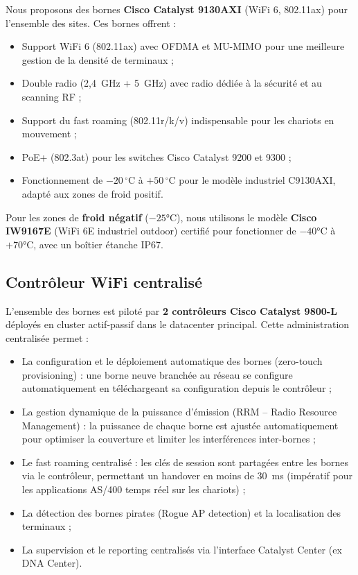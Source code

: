 \documentclass[12pt,a4paper]{report}
\begin{document}
Nous proposons des bornes \textbf{Cisco Catalyst 9130AXI} (WiFi 6, 802.11ax) pour l'ensemble des sites. Ces bornes offrent :

\begin{itemize}
\item Support WiFi 6 (802.11ax) avec OFDMA et MU-MIMO pour une meilleure gestion de la densité de terminaux ;
\item Double radio (2,4~GHz + 5~GHz) avec radio dédiée à la sécurité et au scanning RF ;
\item Support du fast roaming (802.11r/k/v) indispensable pour les chariots en mouvement ;
\item PoE+ (802.3at) pour les switches Cisco Catalyst 9200 et 9300 ;
\item Fonctionnement de $-20\,^\circ\mathrm{C}$ à $+50\,^\circ\mathrm{C}$ pour le modèle industriel C9130AXI, adapté aux zones de froid positif.
\end{itemize}

Pour les zones de \textbf{froid négatif} ($-25$°C), nous utilisons le modèle \textbf{Cisco IW9167E} (WiFi 6E industriel outdoor) certifié pour fonctionner de $-40$°C à $+70$°C, avec un boîtier étanche IP67.

\subsection{Contrôleur WiFi centralisé}

L'ensemble des bornes est piloté par \textbf{2 contrôleurs Cisco Catalyst 9800-L} déployés en cluster actif-passif dans le datacenter principal. Cette administration centralisée permet :

\begin{itemize}
\item La configuration et le déploiement automatique des bornes (zero-touch provisioning) : une borne neuve branchée au réseau se configure automatiquement en téléchargeant sa configuration depuis le contrôleur ;
\item La gestion dynamique de la puissance d'émission (RRM -- Radio Resource Management) : la puissance de chaque borne est ajustée automatiquement pour optimiser la couverture et limiter les interférences inter-bornes ;
\item Le fast roaming centralisé : les clés de session sont partagées entre les bornes via le contrôleur, permettant un handover en moins de 30~ms (impératif pour les applications AS/400 temps réel sur les chariots) ;
\item La détection des bornes pirates (Rogue AP detection) et la localisation des terminaux ;
\item La supervision et le reporting centralisés via l'interface Catalyst Center (ex DNA Center).
\end{itemize}
\end{document}
